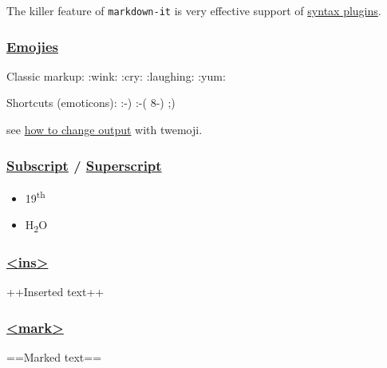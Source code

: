 \documentclass[
  paper=a4,
  ,captions=tableheading
]{scrartcl}
\newcommand{\passthrough}[1]{#1}
\providecommand{\tightlist}{%
  \setlength{\itemsep}{0pt}\setlength{\parskip}{0pt}}
\renewenvironment{quote}{\begin{customblockquote}\list{}{\rightmargin=0em\leftmargin=0em}%
\item\relax\color{blockquote-text}\ignorespaces}{\unskip\unskip\endlist\end{customblockquote}}
\begin{document}
The killer feature of \passthrough{\lstinline!markdown-it!} is very
effective support of
\href{https://www.npmjs.org/browse/keyword/markdown-it-plugin}{syntax
plugins}.

\hypertarget{emojies}{%
\subsubsection{\texorpdfstring{\href{https://github.com/markdown-it/markdown-it-emoji}{Emojies}}{Emojies}}\label{emojies}}

\begin{quote}
Classic markup: :wink: :cry: :laughing: :yum:

Shortcuts (emoticons): :-) :-( 8-) ;)
\end{quote}

see
\href{https://github.com/markdown-it/markdown-it-emoji\#change-output}{how
to change output} with twemoji.

\hypertarget{subscript-superscript}{%
\subsubsection{\texorpdfstring{\href{https://github.com/markdown-it/markdown-it-sub}{Subscript}
/
\href{https://github.com/markdown-it/markdown-it-sup}{Superscript}}{Subscript / Superscript}}\label{subscript-superscript}}

\begin{itemize}
\tightlist
\item
  19\textsuperscript{th}
\item
  H\textsubscript{2}O
\end{itemize}

\hypertarget{ins}{%
\subsubsection{\texorpdfstring{\href{https://github.com/markdown-it/markdown-it-ins}{\textless ins\textgreater{}}}{\textless ins\textgreater{}}}\label{ins}}

++Inserted text++

\hypertarget{mark}{%
\subsubsection{\texorpdfstring{\href{https://github.com/markdown-it/markdown-it-mark}{\textless mark\textgreater{}}}{\textless mark\textgreater{}}}\label{mark}}

==Marked text==
\end{document}
